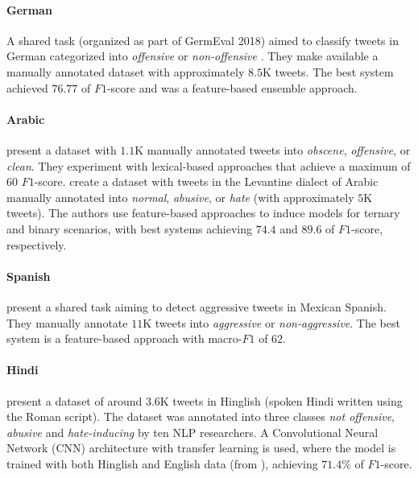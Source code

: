 \documentclass[11pt,a4paper]{article}
\begin{document}
\paragraph{German} A shared task (organized as part of GermEval 2018) aimed to classify tweets in German categorized into \textit{offensive} or \textit{non-offensive} \cite{wiegand-etal-2018-germeval}. They make available a manually annotated dataset with approximately $8.5$K tweets. The best system achieved $76.77$ of $F1$-score and was a feature-based ensemble approach.

\paragraph{Arabic}  present a dataset with $1.1$K manually annotated tweets into \textit{obscene}, \textit{offensive}, or \textit{clean}. They experiment with lexical-based approaches that achieve a maximum of $60$ $F1$-score.  create a dataset with tweets in the Levantine dialect of Arabic manually annotated into \textit{normal}, \textit{abusive}, or \textit{hate} (with approximately $5$K tweets). The authors use feature-based approaches to induce models for ternary and binary scenarios, with best systems achieving $74.4$ and $89.6$ of $F1$-score, respectively. 

\paragraph{Spanish}  present a shared task aiming to detect aggressive tweets in Mexican Spanish. They manually annotate $11$K tweets into \textit{aggressive} or \textit{non-aggressive}. The best system is a feature-based approach with macro-$F1$ of $62$.

\paragraph{Hindi}  present a dataset of around $3.6$K tweets in Hinglish (spoken Hindi written using the Roman script). The dataset was annotated into three classes \textit{not offensive}, \textit{abusive} and \textit{hate-inducing} by ten NLP researchers. A Convolutional Neural Network (CNN) architecture with transfer learning is used, where the model is trained with both Hinglish and English data (from \cite{davidson-etal-2017}), achieving $71.4$\% of $F1$-score.
\end{document}
